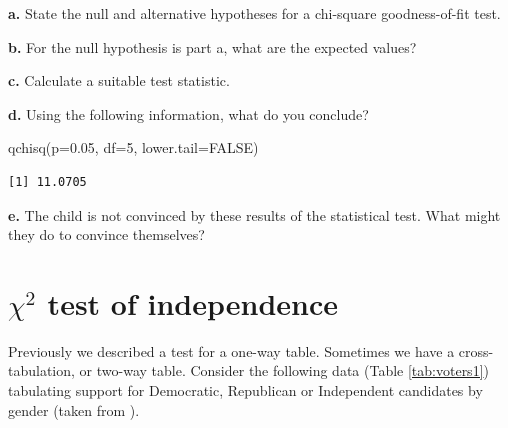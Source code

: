 \documentclass[
  oneside]{krantz}
\newenvironment{Shaded}{\begin{snugshade}}{\end{snugshade}}
\newcommand{\AttributeTok}[1]{\textcolor[rgb]{0.77,0.63,0.00}{#1}}
\newcommand{\ConstantTok}[1]{\textcolor[rgb]{0.00,0.00,0.00}{#1}}
\newcommand{\DecValTok}[1]{\textcolor[rgb]{0.00,0.00,0.81}{#1}}
\newcommand{\FloatTok}[1]{\textcolor[rgb]{0.00,0.00,0.81}{#1}}
\newcommand{\FunctionTok}[1]{\textcolor[rgb]{0.00,0.00,0.00}{#1}}
\newcommand{\NormalTok}[1]{#1}
\begin{document}
\textbf{a.} State the null and alternative hypotheses for a chi-square goodness-of-fit test.

\textbf{b.} For the null hypothesis is part a, what are the expected values?

\textbf{c.} Calculate a suitable test statistic.

\textbf{d.} Using the following information, what do you conclude?

\begin{Shaded}
\begin{Highlighting}[]
\FunctionTok{qchisq}\NormalTok{(}\AttributeTok{p=}\FloatTok{0.05}\NormalTok{, }\AttributeTok{df=}\DecValTok{5}\NormalTok{, }\AttributeTok{lower.tail=}\ConstantTok{FALSE}\NormalTok{)}
\end{Highlighting}
\end{Shaded}

\begin{verbatim}
[1] 11.0705
\end{verbatim}

\textbf{e.} The child is not convinced by these results of the statistical test. What might they do to convince themselves?

\hypertarget{chi2-test-of-independence}{%
\section{\texorpdfstring{\(\chi^2\) test of independence}{\textbackslash chi\^{}2 test of independence}}\label{chi2-test-of-independence}}

Previously we described a test for a one-way table. Sometimes we have a cross-tabulation, or two-way table. Consider the following data (Table \ref{tab:voters1}) tabulating support for Democratic, Republican or Independent candidates by gender (taken from \citep{Agresti2007}).
\end{document}
